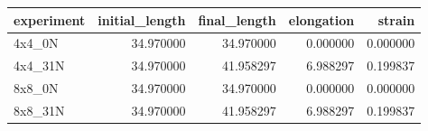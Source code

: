 \begin{tabular}{lrrrr}
\toprule
experiment & initial_length & final_length & elongation & strain \\
\midrule
4x4_0N & 34.970000 & 34.970000 & 0.000000 & 0.000000 \\
4x4_31N & 34.970000 & 41.958297 & 6.988297 & 0.199837 \\
8x8_0N & 34.970000 & 34.970000 & 0.000000 & 0.000000 \\
8x8_31N & 34.970000 & 41.958297 & 6.988297 & 0.199837 \\
\bottomrule
\end{tabular}

